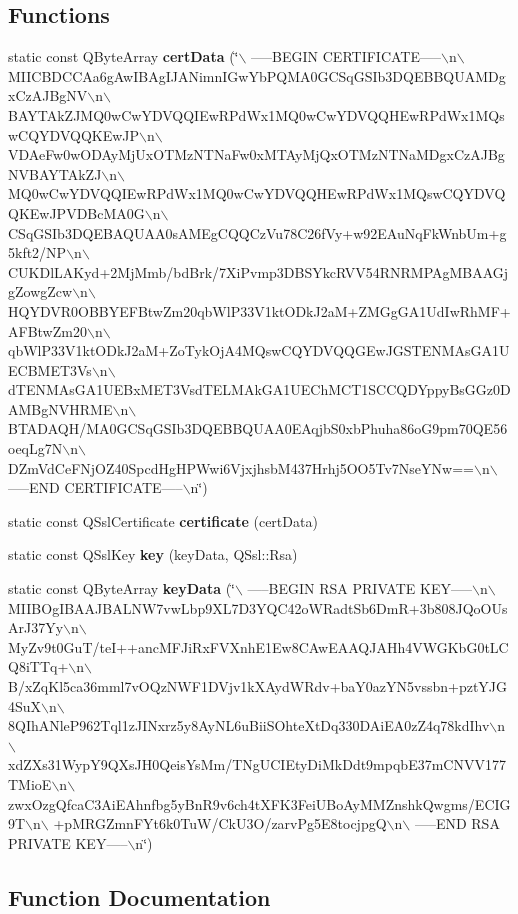 \subsection*{Functions}
\begin{CompactItemize}
\item 
static const QByteArray {\bf certData} (\char`\"{}$\backslash$
-----BEGIN CERTIFICATE-----$\backslash$n$\backslash$
MIICBDCCAa6gAwIBAgIJANimnIGwYbPQMA0GCSqGSIb3DQEBBQUAMDgxCzAJBgNV$\backslash$n$\backslash$
BAYTAkZJMQ0wCwYDVQQIEwRPdWx1MQ0wCwYDVQQHEwRPdWx1MQswCQYDVQQKEwJP$\backslash$n$\backslash$
VDAeFw0wODAyMjUxOTMzNTNaFw0xMTAyMjQxOTMzNTNaMDgxCzAJBgNVBAYTAkZJ$\backslash$n$\backslash$
MQ0wCwYDVQQIEwRPdWx1MQ0wCwYDVQQHEwRPdWx1MQswCQYDVQQKEwJPVDBcMA0G$\backslash$n$\backslash$
CSqGSIb3DQEBAQUAA0sAMEgCQQCzVu78C26fVy+w92EAuNqFkWnbUm+g5kft2/NP$\backslash$n$\backslash$
CUKDlLAKyd+2MjMmb/bdBrk/7XiPvmp3DBSYkcRVV54RNRMPAgMBAAGjgZowgZcw$\backslash$n$\backslash$
HQYDVR0OBBYEFBtwZm20qbWlP33V1ktODkJ2aM+ZMGgGA1UdIwRhMF+AFBtwZm20$\backslash$n$\backslash$
qbWlP33V1ktODkJ2aM+ZoTykOjA4MQswCQYDVQQGEwJGSTENMAsGA1UECBMET3Vs$\backslash$n$\backslash$
dTENMAsGA1UEBxMET3VsdTELMAkGA1UEChMCT1SCCQDYppyBsGGz0DAMBgNVHRME$\backslash$n$\backslash$
BTADAQH/MA0GCSqGSIb3DQEBBQUAA0EAqjbS0xbPhuha86oG9pm70QE56oeqLg7N$\backslash$n$\backslash$
DZmVdCeFNjOZ40SpcdHgHPWwi6VjxjhsbM437Hrhj5OO5Tv7NseYNw==$\backslash$n$\backslash$
-----END CERTIFICATE-----$\backslash$n\char`\"{})
\item 
static const QSslCertificate {\bf certificate} (certData)
\item 
static const QSslKey {\bf key} (keyData, QSsl::Rsa)
\item 
static const QByteArray {\bf keyData} (\char`\"{}$\backslash$
-----BEGIN RSA PRIVATE KEY-----$\backslash$n$\backslash$
MIIBOgIBAAJBALNW7vwLbp9XL7D3YQC42oWRadtSb6DmR+3b808JQoOUsArJ37Yy$\backslash$n$\backslash$
MyZv9t0GuT/teI++ancMFJiRxFVXnhE1Ew8CAwEAAQJAHh4VWGKbG0tLCQ8iTTq+$\backslash$n$\backslash$
B/xZqKl5ca36mml7vOQzNWF1DVjv1kXAydWRdv+baY0azYN5vssbn+pztYJG4SuX$\backslash$n$\backslash$
8QIhANleP962Tql1zJINxrz5y8AyNL6uBiiSOhteXtDq330DAiEA0zZ4q78kdIhv$\backslash$n$\backslash$
xdZXs31WypY9QXsJH0QeisYsMm/TNgUCIEtyDiMkDdt9mpqbE37mCNVV177TMioE$\backslash$n$\backslash$
zwxOzgQfcaC3AiEAhnfbg5yBnR9v6ch4tXFK3FeiUBoAyMMZnshkQwgms/ECIG9T$\backslash$n$\backslash$
+pMRGZmnFYt6k0TuW/CkU3O/zarvPg5E8tocjpgQ$\backslash$n$\backslash$
-----END RSA PRIVATE KEY-----$\backslash$n\char`\"{})
\end{CompactItemize}


\subsection{Function Documentation}
